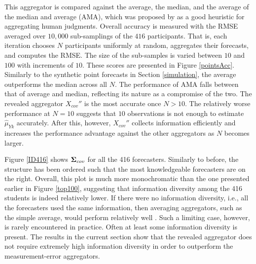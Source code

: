 \documentclass[11pt]{article}
\theoremstyle{definition}
\theoremstyle{definition}
\def\bSigma{{\bf \Sigma}}
\def\Z{{\bf Z}}
\begin{document}
This aggregator is compared against the average, the median, and the average of the median and average (AMA), which was proposed by \citet{lobo2010human} as a good heuristic for aggregating human judgments. Overall accuracy is measured with the RMSE averaged over $10,000$ sub-samplings of the $416$ participants. That is, each iteration chooses $N$ participants uniformly at random, aggregates their forecasts, and computes the RMSE. The size of the sub-samples is varied between $10$ and $100$ with increments of $10$. These scores are presented in Figure \ref{pointsAcc}. Similarly to the synthetic point forecasts in Section \ref{simulation}, the average outperforms the median across all $N$. The performance of AMA falls between that of average and median, reflecting its nature as a compromise of the two. The revealed aggregator $X_{cov}''$ is the most accurate once $N > 10$. The relatively worse performance at $N = 10$ suggests that $10$ observations is not enough to estimate $\hat{\mu}_{Yk}$ accurately.
After this, however, $X_{cov}''$ collects information efficiently and increases the performance advantage against the other aggregators as $N$ becomes larger. 


 Figure \ref{ID416} shows $\bSigma_{cov}$ for all the 416 forecasters. Similarly to before, the structure has been ordered such that the most knowledgeable forecasters are on the right. Overall, this plot is much more monochromatic than the one presented earlier in Figure \ref{top100}, suggesting that information diversity among the 416 students is indeed relatively lower. If there were no information diversity, i.e., all the forecasters used the same information, then averaging aggregators, such as the simple average, would perform relatively well \citep{satopaamodeling}. Such a limiting case, however, is rarely encountered in practice. Often at least some information diversity is present. The results in the current section show that the revealed aggregator does not require extremely high information diversity in order to outperform the measurement-error aggregators. 
 

\end{document}
